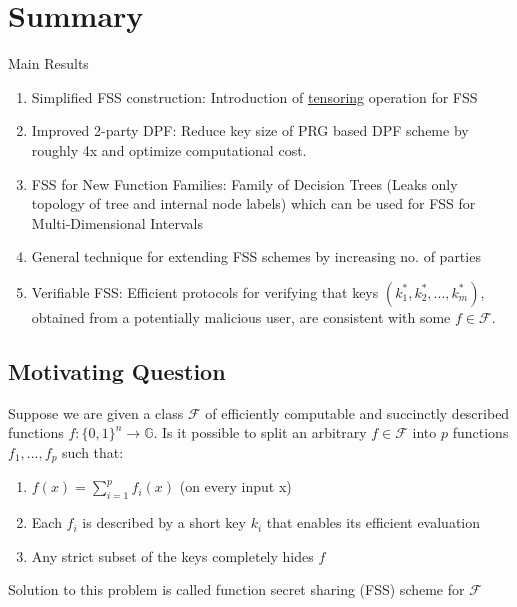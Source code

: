 
\clearpage
{}

%
\setcounter{section}{0} %

\section{Summary}
Main Results
\begin{enumerate}
    \item Simplified FSS construction: Introduction of \underline{tensoring} operation for FSS 
    \item Improved 2-party DPF: Reduce key size of PRG based DPF scheme by roughly 4x and optimize computational cost.
    \item FSS for New Function Families: Family of Decision Trees (Leaks only topology of tree and internal node labels) which can be used for FSS for Multi-Dimensional Intervals
    \item General technique for extending FSS schemes by increasing no. of parties
    \item Verifiable FSS: Efficient protocols for verifying that keys $(k_1^*, k_2^*, ..., k_m^*)$, obtained from a potentially malicious user, are consistent with some $f \in \mathcal{F}$.
\end{enumerate}

\subsection{Motivating Question}
Suppose we are given a class $\mathcal{F}$ of efficiently computable and succinctly described functions $f: \{0, 1\}^n \rightarrow \mathbb{G}$. Is it possible to split an arbitrary $f \in \mathcal{F}$ into $p$ functions $f_1, ..., f_p$ such that:
\begin{enumerate}
    \item $f(x) = \sum_{i=1}^pf_i(x)$ (on every input x)
    \item Each $f_i$ is described by a short key $k_i$ that enables its efficient evaluation
    \item Any strict subset of the keys completely hides $f$
\end{enumerate}
Solution to this problem is called function secret sharing (FSS) scheme for $\mathcal{F}$

